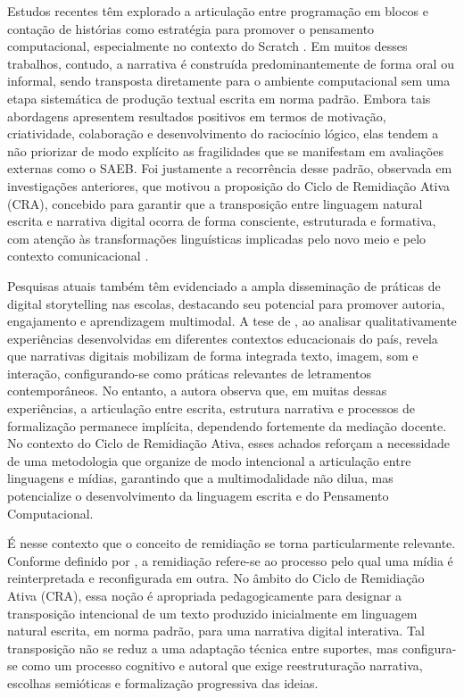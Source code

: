 \documentclass[portuguese]{textolivre}
\begin{document}
Estudos recentes têm explorado a articulação entre programação em blocos e contação de histórias como estratégia para promover o pensamento computacional, especialmente no contexto do Scratch \cite{santos2024}. Em muitos desses trabalhos, contudo, a narrativa é construída predominantemente de forma oral ou informal, sendo transposta diretamente para o ambiente computacional sem uma etapa sistemática de produção textual escrita em norma padrão. Embora tais abordagens apresentem resultados positivos em termos de motivação, criatividade, colaboração e desenvolvimento do raciocínio lógico, elas tendem a não priorizar de modo explícito as fragilidades que se manifestam em avaliações externas como o SAEB. Foi justamente a recorrência desse padrão, observada em investigações anteriores, que motivou a proposição do Ciclo de Remidiação Ativa (CRA), concebido para garantir que a transposição entre linguagem natural escrita e narrativa digital ocorra de forma consciente, estruturada e formativa, com atenção às transformações linguísticas implicadas pelo novo meio e pelo contexto comunicacional \cite{rojo2012}.

Pesquisas atuais também têm evidenciado a ampla disseminação de práticas de digital storytelling nas escolas, destacando seu potencial para promover autoria, engajamento e aprendizagem multimodal. A tese de \textcite{prata2024}, ao analisar qualitativamente experiências desenvolvidas em diferentes contextos educacionais do país, revela que narrativas digitais mobilizam de forma integrada texto, imagem, som e interação, configurando-se como práticas relevantes de letramentos contemporâneos. No entanto, a autora observa que, em muitas dessas experiências, a articulação entre escrita, estrutura narrativa e processos de formalização permanece implícita, dependendo fortemente da mediação docente. No contexto do Ciclo de Remidiação Ativa, esses achados reforçam a necessidade de uma metodologia que organize de modo intencional a articulação entre linguagens e mídias, garantindo que a multimodalidade não dilua, mas potencialize o desenvolvimento da linguagem escrita e do Pensamento Computacional.

É nesse contexto que o conceito de remidiação se torna particularmente relevante. Conforme definido por \textcite{bolter2000}, a remidiação refere-se ao processo pelo qual uma mídia é reinterpretada e reconfigurada em outra. No âmbito do Ciclo de Remidiação Ativa (CRA), essa noção é apropriada pedagogicamente para designar a transposição intencional de um texto produzido inicialmente em linguagem natural escrita, em norma padrão, para uma narrativa digital interativa. Tal transposição não se reduz a uma adaptação técnica entre suportes, mas configura-se como um processo cognitivo e autoral que exige reestruturação narrativa, escolhas semióticas e formalização progressiva das ideias.
\end{document}
